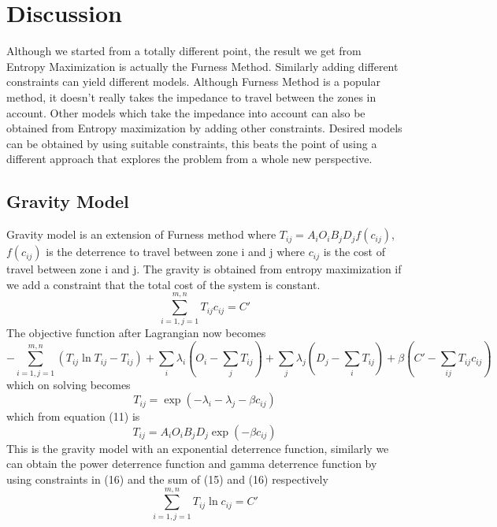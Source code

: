 \documentclass[12pt]{article}
\begin{document}
\section{Discussion}
Although we started from a totally different point, the result we get from Entropy Maximization is actually the Furness Method. Similarly adding different constraints can yield different models. Although Furness Method is a popular method, it doesn't really takes the impedance to travel between the zones in account. Other models which take the impedance into account can also be obtained from Entropy maximization by adding other constraints.
Desired models can be obtained by using suitable constraints, this beats the point of using a different approach that explores the problem from a whole new perspective.
\subsection{Gravity Model}
Gravity model is an extension of Furness method where $T_{ij} = A_{i}O_{i}B_{j}D_{j}f(c_{ij})$, $f(c_{ij})$ is the deterrence to travel between zone i and j where $c_{ij}$ is the cost of travel between zone i and j. The gravity is obtained from entropy maximization if we add a constraint that the total cost of the system is constant.
    \begin{equation}
        \sum_{i=1,j=1}^{m,n}T_{ij}c_{ij} = C'
    \end{equation}
The objective function after Lagrangian now becomes
\begin{equation}
        -\sum_{i=1,j=1}^{m,n}(T_{ij}\ln{T_{ij}} - T_{ij}) + \sum_{i}\lambda_{i}(O_{i} - \sum_{j}T_{ij}) + \sum_{j}\lambda_{j}(D_{j} - \sum_{i}T_{ij}) + \beta(C' - \sum_{ij}T_{ij}c_{ij})
    \end{equation}
which on solving becomes
    \begin{equation}
        T_{ij} = \exp{(-\lambda_{i}-\lambda_{j}-\beta c_{ij})}
    \end{equation}
which from equation (11) is
    \begin{equation}
        T_{ij} = A_{i}O_{i}B_{j}D_{j}\exp{(-\beta c_{ij})}
    \end{equation}
This is the gravity model with an exponential deterrence function, similarly we can obtain the power deterrence function and gamma deterrence function by using constraints in (16) and the sum of (15) and (16) respectively
    \begin{equation}
        \sum_{i=1,j=1}^{m,n}T_{ij}\ln{c_{ij}} = C'
    \end{equation}
    
\end{document}
